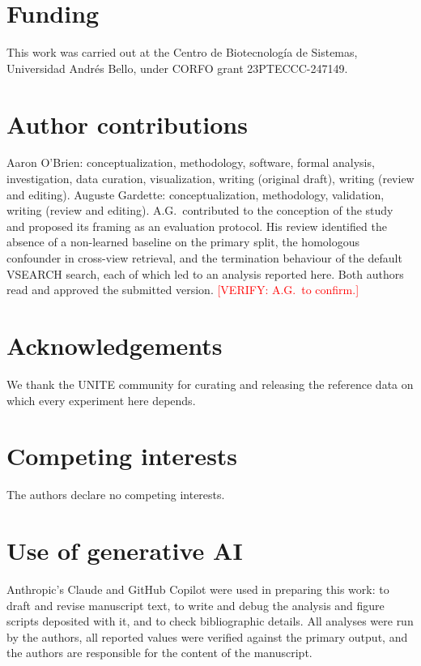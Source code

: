 \documentclass[11pt]{article}
\newcommand{\verify}[1]{\textcolor{red}{[VERIFY: #1]}}
\newcommand{\verify}[1]{}
\begin{document}
\section*{Funding}
This work was carried out at the Centro de Biotecnolog\'ia de Sistemas,
Universidad Andr\'es Bello, under CORFO grant 23PTECCC-247149.

\section*{Author contributions}
Aaron O'Brien: conceptualization, methodology, software, formal analysis,
investigation, data curation, visualization, writing (original draft), writing
(review and editing). Auguste Gardette: conceptualization, methodology,
validation, writing (review and editing). A.G.\ contributed to the conception of
the study and proposed its framing as an evaluation protocol. His review
identified the absence of a non-learned baseline on the primary split, the
homologous confounder in cross-view retrieval, and the termination behaviour of
the default VSEARCH search, each of which led to an analysis reported here. Both
authors read and approved the submitted version. \verify{A.G.\ to confirm.}

\section*{Acknowledgements}
We thank the UNITE community for curating and releasing the reference data on
which every experiment here depends.

\section*{Competing interests}
The authors declare no competing interests.

\section*{Use of generative AI}
Anthropic's Claude and GitHub Copilot were used in preparing this work: to
draft and revise manuscript text, to write and debug the analysis and figure
scripts deposited with it, and to check bibliographic details. All analyses
were run by the authors, all reported values were verified against the primary
output, and the authors are responsible for the content of the manuscript.

\appendix
\renewcommand{\thetable}{S\arabic{table}}
\renewcommand{\thefigure}{S\arabic{figure}}
\renewcommand{\theHtable}{S\arabic{table}}
\renewcommand{\theHfigure}{S\arabic{figure}}
\setcounter{table}{0}
\setcounter{figure}{0}
\end{document}
